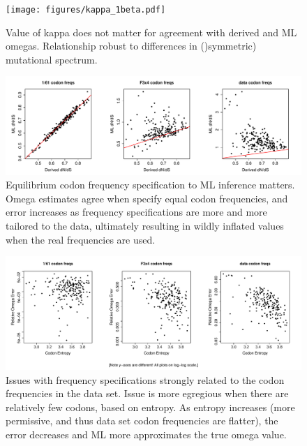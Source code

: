 \documentclass[11pt]{article}
\begin{document}
\begin{figure}[H]
\centerline{\texttt{[image: figures/kappa\_1beta.pdf]}}
\caption{\label{kappa} Value of kappa does not matter for agreement with derived and ML omegas. Relationship robust to differences in ()symmetric) mutational spectrum.}
\end{figure}

\begin{figure}[H]
\centerline{\includegraphics[width=6in]{figures/freqspec_1beta.pdf}}
\caption{\label{freqspec_compare} Equilibrium codon frequency specification to ML inference matters. Omega estimates agree when specify equal codon frequencies, and error increases as frequency specifications are more and more tailored to the data, ultimately resulting in wildly inflated values when the real frequencies are used.}
\end{figure}

\begin{figure}[H]
\centerline{\includegraphics[width=6in]{figures/freqspec_entropy_error.pdf}}
\caption{\label{freqspec_compare} Issues with frequency specifications strongly related to the codon frequencies in the data set. Issue is more egregious when there are relatively few codons, based on entropy. As entropy increases (more permissive, and thus data set codon frequencies are flatter), the error decreases and ML more approximates the true omega value.}
\end{figure}
\end{document}
